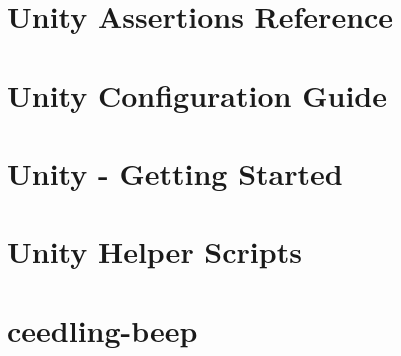 \let\mypdfximage\pdfximage\def\pdfximage{\immediate\mypdfximage}\documentclass[twoside]{book}
\newcommand{\+}{\discretionary{\mbox{\scriptsize$\hookleftarrow$}}{}{}}
\begin{document}
\chapter{Unity Assertions Reference}
\label{md__c__mpb_component_mpb_digital_filtering__unit_test_framework_vendor_ceedling_docs__unity_assertions_reference}

\chapter{Unity Configuration Guide}
\label{md__c__mpb_component_mpb_digital_filtering__unit_test_framework_vendor_ceedling_docs__unity_configuration_guide}

\chapter{Unity -\/ Getting Started}
\label{md__c__mpb_component_mpb_digital_filtering__unit_test_framework_vendor_ceedling_docs__unity_getting_started_guide}

\chapter{Unity Helper Scripts}
\label{md__c__mpb_component_mpb_digital_filtering__unit_test_framework_vendor_ceedling_docs__unity_helper_scripts_guide}

\chapter{ceedling-\/beep}
\label{md__c__mpb_component_mpb_digital_filtering__unit_test_framework_vendor_ceedling_plugins_beep__r_e_a_d_m_e}

\end{document}
